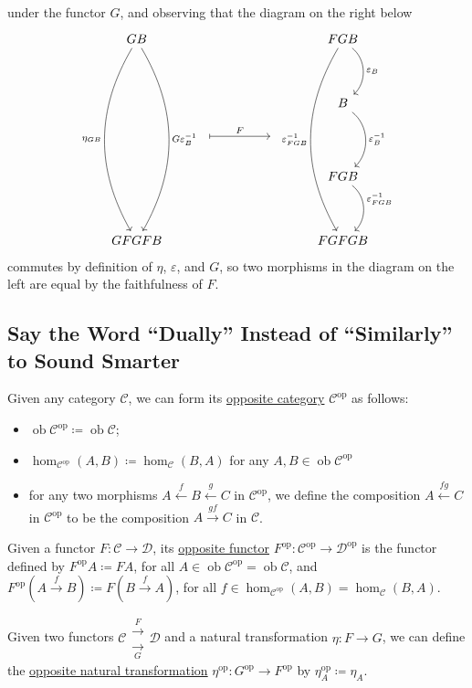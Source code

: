 \documentclass[a4paper,11pt]{article}
\theoremstyle{break_italics}
\theoremstyle{break_upright}
\theoremstyle{remark}
\newcommand{\ob}{\operatorname{ob}}
\newcommand{\C}{\mathcal{C}}
\newcommand{\D}{\mathcal{D}}
\newcommand{\op}{\mathrm{op}}
\begin{document}
under the functor $G$, and observing that the diagram on the right below
\[
\begin{tikzcd}
GB \arrow[dddddd, "G\varepsilon_B^{-1}", bend left] \arrow[dddddd, "\eta_{GB}"', bend right] &     &  &    & FGB \arrow[dd, "\varepsilon_B", bend left=49] \arrow[dddddd, "\varepsilon_{FGB}^{-1}"', bend right] \\   &  &  &    &  \\      &  &  &    & B \arrow[dd, "\varepsilon_B^{-1}", bend left=49]           \\     & {} \arrow[rr, "F", maps to] &  & {} &  \\    &  &  &    & FGB \arrow[dd, "\varepsilon_{FGB}^{-1}", bend left=49]  \\   &  &  &    &    \\ GFGFB   &   &  &    & FGFGB                                                                                              
\end{tikzcd}
\]
commutes by definition of $\eta$, $\varepsilon$, and $G$, so two morphisms in the diagram on the left are equal by the faithfulness of $F$.





\subsection{Say the Word ``Dually'' Instead of ``Similarly'' to Sound Smarter}

Given any category $\C$, we can form its \uline{opposite category} $\C^\op$ as follows:
\begin{itemize}
	\item $\ob\C^\op \coloneqq \ob\C$;
	\item $\hom_{\C^\op}(A,B) \coloneqq \hom_\C(B,A)$ for any $A,B\in \ob\C^\op$
	\item for any two morphisms $A \xleftarrow{f} B \xleftarrow{g} C$ in $\C^\op$, we define the composition $A \xleftarrow{fg}C$ in $\C^\op$ to be the composition $A \xrightarrow{gf} C$ in $\C$.
\end{itemize}

Given a functor $F \colon \C \to \D$, its \uline{opposite functor} $F^\op \colon \C^\op \to \D^\op$ is the functor defined by $F^\op A \coloneqq FA$, for all $A \in \ob\C^\op = \ob\C$, and $F^\op (A \xrightarrow{f} B) \coloneqq F(B \xrightarrow{f} A)$, for all $f \in \hom_{\C^\op}(A,B) = \hom_\C(B,A)$.

Given two functors $\C \substack{\xrightarrow{F} \\ \xrightarrow[G]{}} \D$ and a natural transformation $\eta \colon F \to G$, we can define the \uline{opposite natural transformation} $\eta^\op \colon G^\op \to F^\op$ by $\eta^\op_A \coloneqq \eta_A$.
\end{document}
